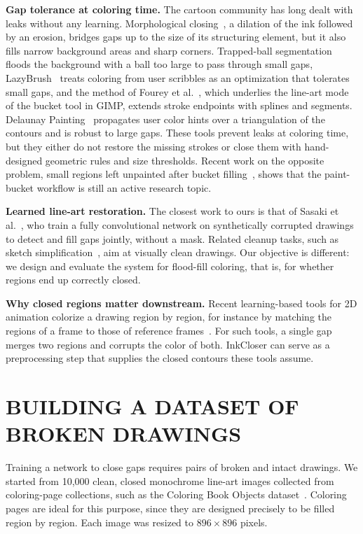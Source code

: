 \documentclass{IEEEcsmag}
\begin{document}
\textbf{Gap tolerance at coloring time.} The cartoon community has long dealt with
leaks without any learning. Morphological closing~\cite{serra1982morphology}, a
dilation of the ink followed by an erosion, bridges gaps up to the size of its
structuring element, but it also fills narrow background areas and sharp corners.
Trapped-ball segmentation~\cite{zhang2009vectorizing} floods the background with a
ball too large to pass through small gaps, LazyBrush~\cite{sykora2009lazybrush}
treats coloring from user scribbles as an optimization that tolerates small gaps,
and the method of Fourey et al.~\cite{fourey2018flat}, which underlies the line-art
mode of the bucket tool in GIMP, extends stroke endpoints with splines and segments.
Delaunay Painting~\cite{parakkat2022delaunay} propagates user color hints over a
triangulation of the contours and is robust to large gaps. These tools prevent leaks
at coloring time, but they either do not restore the missing strokes or close them
with hand-designed geometric rules and size thresholds. Recent work on the opposite
problem, small regions left unpainted after bucket filling~\cite{kono2026gapfill},
shows that the paint-bucket workflow is still an active research topic.

\textbf{Learned line-art restoration.} The closest work to ours is that of Sasaki et
al.~\cite{sasaki2017joint}, who train a fully convolutional network on synthetically
corrupted drawings to detect and fill gaps jointly, without a mask. Related cleanup
tasks, such as sketch simplification~\cite{simoserra2016simplify}, aim at visually
clean drawings. Our objective is different: we design and evaluate the system for
flood-fill coloring, that is, for whether regions end up correctly closed.

\textbf{Why closed regions matter downstream.} Recent learning-based tools for 2D
animation colorize a drawing region by region, for instance by matching the regions
of a frame to those of reference frames~\cite{casey2021animation,dai2024inclusion}.
For such tools, a single gap merges two regions and corrupts the color of both.
InkCloser can serve as a preprocessing step that supplies the closed contours these
tools assume.

\section{BUILDING A DATASET OF BROKEN DRAWINGS}

Training a network to close gaps requires pairs of broken and intact drawings. We
started from 10,000 clean, closed monochrome line-art images collected from
coloring-page collections, such as the Coloring Book Objects
dataset~\cite{chen2019human}. Coloring pages are ideal for this purpose, since they
are designed precisely to be filled region by region. Each image was resized to
$896\times 896$ pixels.
\end{document}
